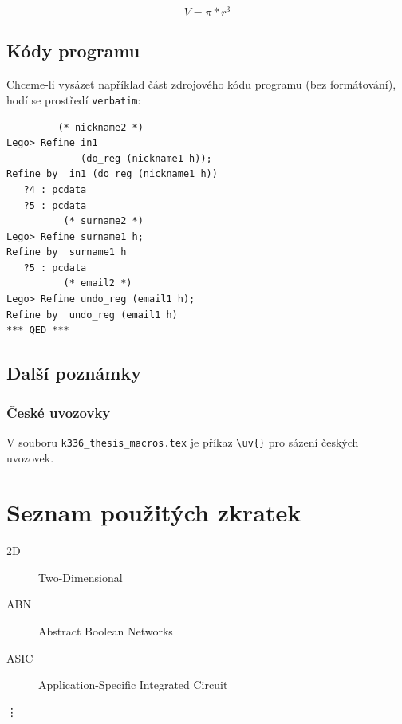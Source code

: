 \documentclass[11pt,twoside,a4paper]{book}
\begin{document}
\begin{equation}
  V = \pi * r^3
\end{equation}

\section{Kódy programu}
Chceme-li vysázet například část zdrojového kódu programu (bez formátování), hodí se prostředí \verb|verbatim|: 
\begin{verbatim}
         (* nickname2 *)
Lego> Refine in1
             (do_reg (nickname1 h));
Refine by  in1 (do_reg (nickname1 h))
   ?4 : pcdata
   ?5 : pcdata
          (* surname2 *)
Lego> Refine surname1 h;
Refine by  surname1 h
   ?5 : pcdata
          (* email2 *)
Lego> Refine undo_reg (email1 h);
Refine by  undo_reg (email1 h)
*** QED ***
\end{verbatim}

\section{Další poznámky}
\subsection{České uvozovky}
V souboru \verb|k336_thesis_macros.tex| je příkaz \verb|\uv{}| pro sázení českých uvozovek. 


\chapter{Seznam použitých zkratek}

\begin{description}
\item[2D] Two-Dimensional
\item[ABN] Abstract Boolean Networks
\item[ASIC] Application-Specific Integrated Circuit
\end{description}
\vdots
\end{document}
